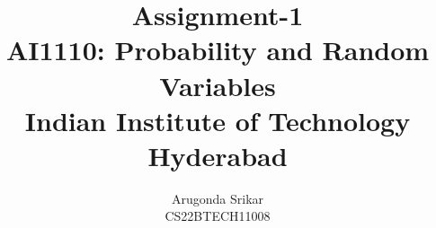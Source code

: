 \documentclass[12pt, journal]{IEEEtran}
\title{Assignment-1 \\ \Large AI1110: Probability and Random Variables \\ \large Indian Institute of Technology Hyderabad}
\author{Arugonda Srikar \\ \normalsize CS22BTECH11008}
\DeclareMathOperator*{\Res}{Res}
\begin{document}
	\newtheorem{theorem}{Theorem}[section]
	\newtheorem{problem}{Problem}
	\newtheorem{proposition}{Proposition}[section]
	\newtheorem{lemma}{Lemma}[section]
	\newtheorem{corollary}[theorem]{Corollary}
	\newtheorem{example}{Example}[section]
	\newtheorem{definition}[problem]{Definition}
	\newcommand{\BEQA}{\begin{eqnarray}}
	\newcommand{\EEQA}{\end{eqnarray}}
	\newcommand{\define}{\stackrel{\triangle}{=}}

	


	\providecommand{\mbf}{\mathbf}
	\providecommand{\pr}[1]{\ensuremath{\Pr\left(#1\right)}}
	\providecommand{\qfunc}[1]{\ensuremath{Q\left(#1\right)}}
	\providecommand{\sbrak}[1]{\ensuremath{{}\left[#1\right]}}
	\providecommand{\lsbrak}[1]{\ensuremath{{}\left[#1\right.}}
	\providecommand{\rsbrak}[1]{\ensuremath{{}\left.#1\right]}}
	\providecommand{\brak}[1]{\ensuremath{\left(#1\right)}}
	\providecommand{\lbrak}[1]{\ensuremath{\left(#1\right.}}
	\providecommand{\rbrak}[1]{\ensuremath{\left.#1\right)}}
	\providecommand{\cbrak}[1]{\ensuremath{\left\{#1\right\}}}
	\providecommand{\lcbrak}[1]{\ensuremath{\left\{#1\right.}}
	\providecommand{\rcbrak}[1]{\ensuremath{\left.#1\right\}}}
	\theoremstyle{remark}
	\newtheorem{rem}{Remark}
	\newcommand{\sgn}{\mathop{\mathrm{sgn}}}
	\providecommand{\abs}[1]{\left\vert#1\right\vert}
	\providecommand{\res}[1]{\Res\displaylimits_{#1}} 
	\providecommand{\norm}[1]{\left\lVert#1\right\rVert}
	\providecommand{\mtx}[1]{\mathbf{#1}}
	\providecommand{\mean}[1]{E\left[ #1 \right]}
	\providecommand{\fourier}{\overset{\mathcal{F}}{ \rightleftharpoons}}
	\providecommand{\system}{\overset{\mathcal{H}}{ \longleftrightarrow}}
	\newcommand{\solution}{\noindent \textbf{Solution: }}
	\newcommand{\cosec}{\,\text{cosec}\,}
	\providecommand{\dec}[2]{\ensuremath{\overset{#1}{\underset{#2}{\gtrless}}}}
	\newcommand{\myvec}[1]{\ensuremath{\begin{pmatrix}#1\end{pmatrix}}}
	\newcommand{\mydet}[1]{\ensuremath{\begin{vmatrix}#1\end{vmatrix}}}
	
\end{document}
